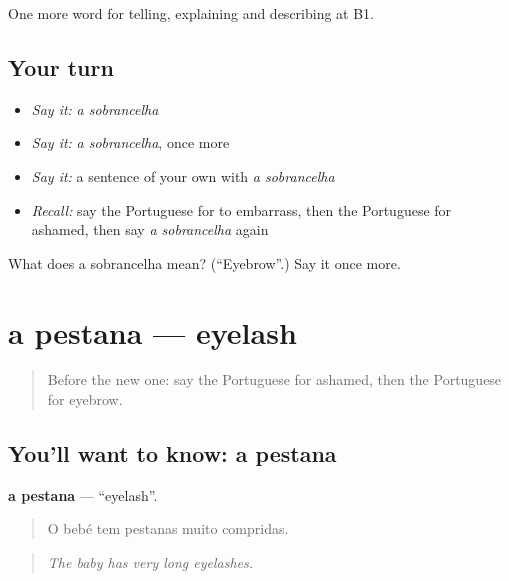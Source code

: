 \begin{grammarlens}[title={What you've built}]
One more word for telling, explaining and describing at B1.
\end{grammarlens}

\subsection*{Your turn}
\begin{itemize}
\raggedright
  \item \emph{Say it:} \emph{a sobrancelha}
  \item \emph{Say it:} \emph{a sobrancelha}, once more
  \item \emph{Say it:} a sentence of your own with \emph{a sobrancelha}
  \item \emph{Recall:} say the Portuguese for to embarrass, then the Portuguese for ashamed, then say \emph{a sobrancelha} again
\end{itemize}

\begin{tcolorbox}[breakable,colback=teal!4,colframe=teal!35!black,title={Before you move on}]
What does a sobrancelha mean? (\textquotedblleft{}Eyebrow\textquotedblright{}.) Say it once more.
\end{tcolorbox}
\section[a pestana]{a pestana — eyelash}

\label{lesson:PT-C481-pestana}



\begin{quote}
Before the new one: say the Portuguese for ashamed, then the Portuguese for eyebrow.
\end{quote}

\subsection*{You'll want to know: a pestana}
\textbf{a pestana} — \textquotedblleft{}eyelash\textquotedblright{}.

\begin{quote}
O bebé tem pestanas muito compridas.
\end{quote}

\begin{quote}
\emph{The baby has very long eyelashes.}
\end{quote}

